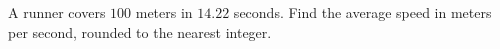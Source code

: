 A runner covers $100$ meters in $14.22$ seconds. Find the average speed in meters per second, rounded to the nearest integer.
